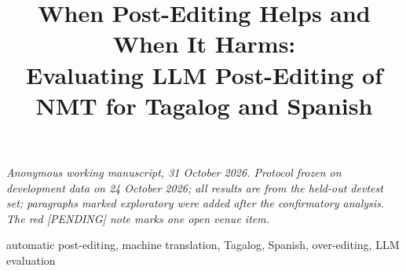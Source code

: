 \documentclass[conference]{IEEEtran}
\newif\iffinal \finalfalse
\newcommand{\draftstatus}{Anonymous working manuscript, 31 October 2026. Protocol frozen on development data on 24 October 2026; all results are from the held-out devtest set; paragraphs marked exploratory were added after the confirmatory analysis. The red [PENDING] note marks one open venue item.}
\begin{document}
\title{When Post-Editing Helps and When It Harms:\\Evaluating LLM Post-Editing of NMT for Tagalog and Spanish}
\author{}
\maketitle
\iffinal\else\begin{center}\small\itshape\draftstatus\end{center}\fi

\begin{IEEEkeywords}automatic post-editing, machine translation, Tagalog, Spanish, over-editing, LLM evaluation\end{IEEEkeywords}










\end{document}
